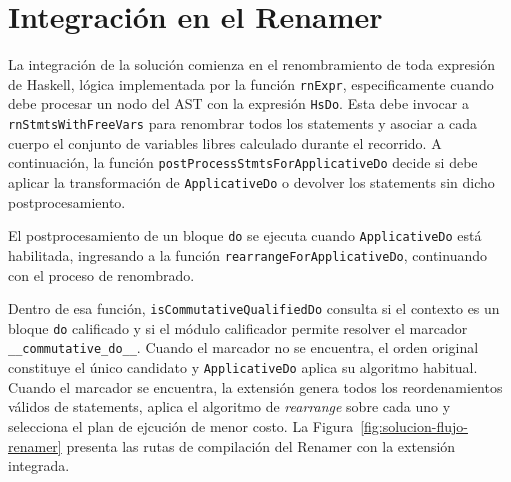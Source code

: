 
\section{Integración en el Renamer}
\label{sec:solucion-integracion-renamer}

La integración de la solución comienza en el renombramiento de toda expresión de \textsf{Haskell}, lógica implementada por la función \texttt{rnExpr}, especificamente cuando debe procesar un nodo del AST con la expresión \texttt{HsDo}. Esta debe invocar a \texttt{rnStmtsWithFreeVars} para renombrar todos los statements y asociar a cada cuerpo el conjunto de variables libres calculado durante el recorrido. A continuación, la función \texttt{postProcessStmtsForApplicativeDo} decide si debe aplicar la transformación de \texttt{ApplicativeDo} o devolver los statements sin dicho postprocesamiento.

El postprocesamiento de un bloque \texttt{do} se ejecuta cuando \texttt{ApplicativeDo} está habilitada, ingresando a la función \texttt{rearrangeForApplicativeDo}, continuando con el proceso de renombrado.

Dentro de esa función, \texttt{isCommutativeQualifiedDo} consulta si el contexto es un bloque \texttt{do} calificado y si el módulo calificador permite resolver el marcador \texttt{\_\_commutative\_do\_\_}. Cuando el marcador no se encuentra, el orden original constituye el único candidato y \texttt{ApplicativeDo} aplica su algoritmo habitual. Cuando el marcador se encuentra, la extensión genera todos los reordenamientos válidos de statements, aplica el algoritmo de \textit{rearrange} sobre cada uno y selecciona el plan de ejcución de menor costo. La Figura~\ref{fig:solucion-flujo-renamer} presenta las rutas de compilación del Renamer con la extensión integrada.

